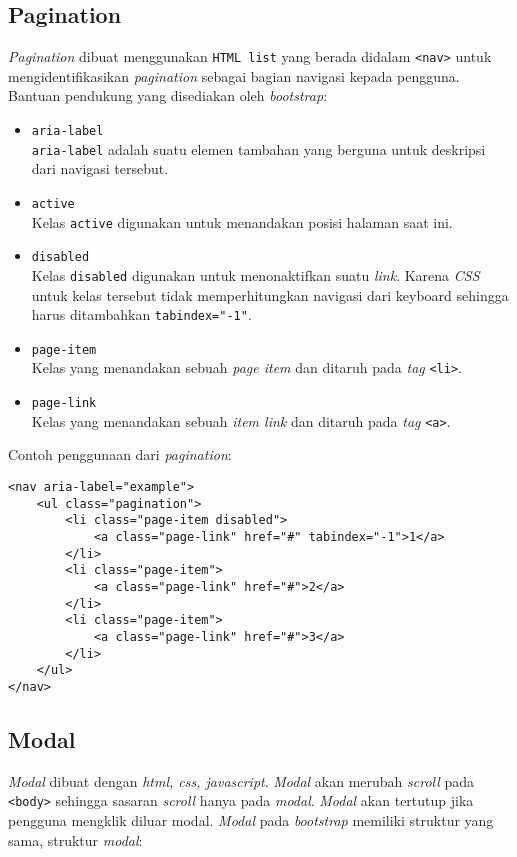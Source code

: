 \subsection{Pagination}
\textit{Pagination} dibuat menggunakan \texttt{HTML list} yang berada didalam \texttt{<nav>} untuk mengidentifikasikan \textit{pagination} sebagai bagian navigasi kepada pengguna. Bantuan pendukung yang disediakan oleh \textit{bootstrap}:

\begin{itemize}
	\item \texttt{aria-label} \\
	\texttt{aria-label} adalah suatu elemen tambahan yang berguna untuk deskripsi dari navigasi tersebut.
	\item \texttt{active} \\
	Kelas \texttt{active} digunakan untuk menandakan posisi halaman saat ini.
	\item \texttt{disabled} \\
	Kelas \texttt{disabled} digunakan untuk menonaktifkan suatu \textit{link}. Karena \textit{CSS} untuk kelas tersebut tidak memperhitungkan navigasi dari keyboard sehingga harus ditambahkan \texttt{tabindex="-1"}. 
	\item \texttt{page-item} \\
	Kelas yang menandakan sebuah \textit{page item} dan ditaruh pada \textit{tag} \texttt{<li>}.
	\item \texttt{page-link} \\	
	Kelas yang menandakan sebuah \textit{item link} dan ditaruh pada \textit{tag} \texttt{<a>}.
	
\end{itemize}
Contoh penggunaan dari \textit{pagination}:
	\begin{lstlisting}
<nav aria-label="example">
	<ul class="pagination">
		<li class="page-item disabled">
			<a class="page-link" href="#" tabindex="-1">1</a>
		</li>
		<li class="page-item">
			<a class="page-link" href="#">2</a>
		</li>
		<li class="page-item">
			<a class="page-link" href="#">3</a>
		</li>
	</ul>
</nav>	
\end{lstlisting}




\subsection{Modal}
\textit{Modal} dibuat dengan \textit{html, css, javascript}. \textit{Modal} akan merubah \textit{scroll} pada \texttt{<body>} sehingga sasaran \textit{scroll} hanya pada \textit{modal}. \textit{Modal} akan tertutup jika pengguna mengklik diluar modal. \textit{Modal} pada \textit{bootstrap} memiliki struktur yang sama, struktur \textit{modal}:

